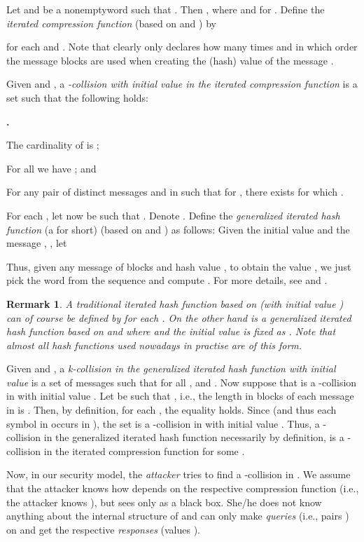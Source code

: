 \documentclass[submission,copyright,creativecommons]{eptcs}
\newcounter{dep}
\newenvironment{luet}
{
\setlength{\parskip}{5pt}
\begin{list}
{{\bf \arabic{dep}.}}{\usecounter{dep}\setlength{\topsep}{1pt}\setlength{\rightmargin}{\leftmargin}\setlength{\parsep}{3pt}\setlength{\itemsep}{2pt}}
}
{\end{list}}
\newtheorem{remark}{Rermark}
\begin{document}
Let  and  be a nonemptyword such that . Then , where  and  for . Define the \emph{iterated compression function}  (based on 
and ) by 

for each  and . Note that clearly  only declares how many times and in which order the message blocks  are used when creating the (hash) value  of the message . 

Given  and , a \textit{-collision with  initial value  in the iterated compression function } is a set  such that the following holds:
\begin{luet}
\item[] The cardinality of  is ; 
\item[] For  all  we have ; and
\item[] For any pair of distinct messages  and  in  such that  for , there  exists  for which .
\end{luet}

For each , let now  be such that
. Denote . Define the \emph{generalized iterated hash function} (a  for short)
 (based on  and ) as follows: Given the
initial value  and the message , , let


Thus,  given any message  of  blocks and hash value , to obtain the value , we just pick the word  from the sequence  and compute . For more details, see \cite{KHK} and \cite{HoS}.

\begin{remark}\label{Tra}
A traditional iterated hash function  based on  (with initial value ) can of
course be defined by  for each
. On the other hand  is a generalized iterated
hash function  based on  and 
where  and the initial
value is fixed as . Note that almost all hash functions used nowadays in practise are of this form.  
\end{remark}

Given  and , a \textit{k-collision in the generalized iterated hash function  with initial value } is a set
 of  messages such that for all ,
 and . Now suppose
that  is a -collision in  with
initial value . Let  be such that
, i.e., the length in blocks of each message in
 is . Then, by definition, for each , the equality
 holds. Since
 (and thus each symbol in  occurs in ), the set  is a -collision
in  with initial value . Thus, a -collision in the generalized iterated hash function  necessarily by definition, is a -collision in the iterated compression function  for some .

Now, in our security model, the \textit{attacker} tries to find a -collision in . We assume that the attacker knows how  depends on the respective compression function  (i.e., the attacker knows ), but sees  only
as a black box. She/he does not know anything about the internal
structure of  and can only make \textit{queries} (i.e., pairs ) on
 and get the respective \textit{responses} (values ).
\end{document}

